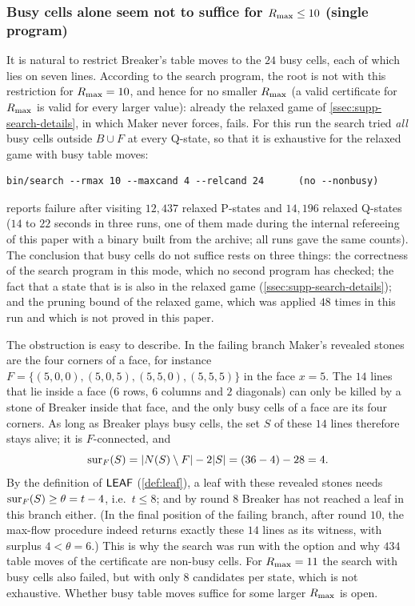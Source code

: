 \subsubsection*{Busy cells alone seem not to suffice for $R_{\max}\le 10$ (single program)}
It is natural to restrict Breaker's table moves to the $24$ busy cells, each of which lies on seven
lines. According to the search program, the root is not \WON{} with this restriction for $R_{\max}=10$, and
hence for no smaller $R_{\max}$ (a
valid certificate for $R_{\max}$ is valid for every larger value): already the relaxed game of
\cref{ssec:supp-search-details}, in which Maker never forces, fails. For this run the search tried \emph{all} busy cells
outside $B\cup F$ at every Q-state, so that it is exhaustive for the relaxed game with busy table moves:
\begin{verbatim}
bin/search --rmax 10 --maxcand 4 --relcand 24      (no --nonbusy)
\end{verbatim}
reports failure after visiting $12{,}437$ relaxed P-states and $14{,}196$ relaxed Q-states ($14$ to $22$
seconds in three runs, one of them made during the internal refereeing of this paper with a binary built
from the archive; all runs gave the same counts). The conclusion that busy cells do not suffice rests on three things: the
correctness of the search program in this mode, which no second program has checked; the fact that a
state that is \WON{} is also \WON{} in the relaxed game (\cref{ssec:supp-search-details}); and the pruning bound of the
relaxed game, which was applied $48$ times in this run and which is not proved in this paper.

The obstruction is easy to describe. In the failing branch Maker's revealed stones are the four corners
of a face, for instance $F=\{(5,0,0),(5,0,5),(5,5,0),(5,5,5)\}$ in the face $x=5$. The $14$ lines that lie
inside a face ($6$ rows, $6$ columns and $2$ diagonals) can only be killed by a stone of Breaker inside
that face, and the only busy cells of a face are its four corners. As long as Breaker plays busy cells,
the set
$S$ of these $14$ lines therefore stays alive; it is $F$-connected, and
\[
\operatorname{sur}_F(S)=|N(S)\setminus F|-2|S| = (36-4)-28 = 4 .
\]
By the definition of $\mathsf{LEAF}$ (\cref{def:leaf}), a leaf with these revealed stones needs
$\operatorname{sur}_F(S)\ge\theta=t-4$, i.e.\ $t\le 8$; and by round $8$ Breaker has not reached a leaf in this branch
either. (In the final position of the failing branch, after round $10$, the max-flow procedure indeed
returns exactly these $14$ lines as its witness, with surplus $4<\theta=6$.) This is why the search was run
with the option  and why $434$ table moves of the certificate are non-busy cells. For
$R_{\max}=11$ the search with busy cells also failed, but with only $8$ candidates per state, which is not
exhaustive. Whether busy table moves suffice for some larger $R_{\max}$ is open.

